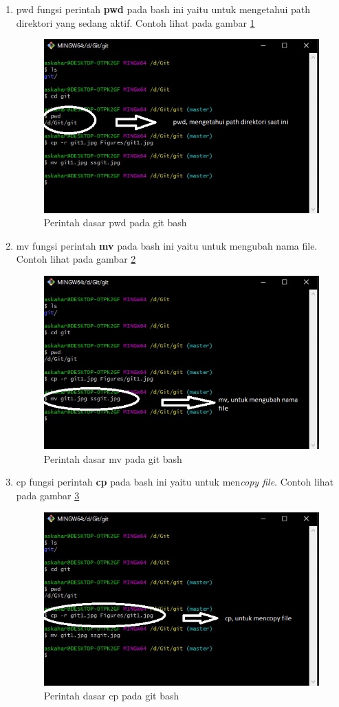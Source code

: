 \begin{enumerate}
\item pwd 
	fungsi perintah \textbf{pwd} pada bash ini yaitu untuk mengetahui path direktori yang sedang aktif.
Contoh lihat pada gambar \ref{pwd}
\begin{figure}[!htbp]
\centerline{\includegraphics[width=.75\textwidth]{Figures/pwd.jpg}}
\caption{Perintah dasar pwd pada git bash}
\label{pwd}
\end{figure}

\item mv 
	fungsi perintah \textbf{mv} pada bash ini yaitu untuk mengubah nama file.
Contoh lihat pada gambar \ref{mv}
\begin{figure}[!htbp]
\centerline{\includegraphics[width=.75\textwidth]{Figures/mv.jpg}}
\caption{Perintah dasar mv pada git bash}
\label{mv}
\end{figure}

\item cp
	fungsi perintah \textbf{cp} pada bash ini yaitu untuk men\textit{copy file}.
Contoh lihat pada gambar \ref{cp}
\begin{figure}[!htbp]
\centerline{\includegraphics[width=.75\textwidth]{Figures/cp.jpg}}
\caption{Perintah dasar cp pada git bash}
\label{cp}
\end{figure}

\end{enumerate}

 
